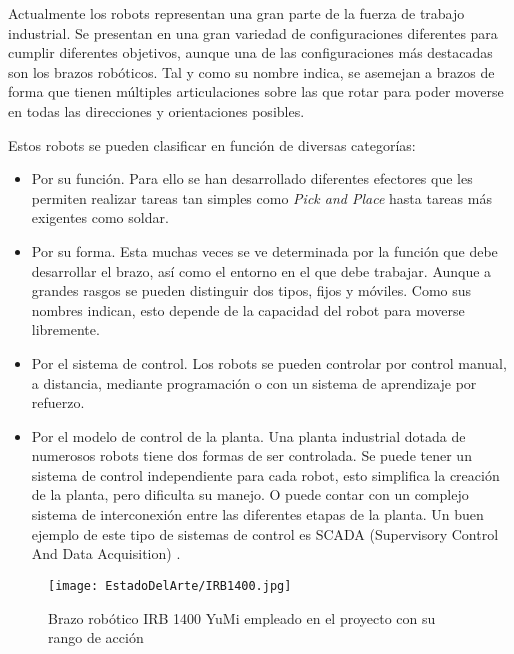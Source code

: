 Actualmente los robots representan una gran parte de la fuerza de trabajo industrial. Se presentan en una gran variedad de configuraciones diferentes para cumplir diferentes objetivos, aunque una de las configuraciones más destacadas son los brazos robóticos. Tal y como su nombre indica, se asemejan a brazos de forma que tienen múltiples articulaciones sobre las que rotar para poder moverse en todas las direcciones y orientaciones posibles. 

Estos robots se pueden clasificar en función de diversas categorías:
\begin{itemize}
\item Por su función. Para ello se han desarrollado diferentes efectores que les permiten realizar tareas tan simples como \textit{Pick and Place} hasta tareas más exigentes como soldar.
		
\item Por su forma. Esta muchas veces se ve determinada por la función que debe desarrollar el brazo, así como el entorno en el que debe trabajar. Aunque a grandes rasgos se pueden distinguir dos tipos, fijos y móviles. Como sus nombres indican, esto depende de la capacidad del robot para moverse libremente.
		
\item Por el sistema de control. Los robots se pueden controlar por control manual, a distancia, mediante programación o con un sistema de aprendizaje por refuerzo.
		
\item Por el modelo de control de la planta. Una planta industrial dotada de numerosos robots tiene dos formas de ser controlada. Se puede tener un sistema de control independiente para cada robot, esto simplifica la creación de la planta, pero dificulta su manejo. O puede contar con un complejo sistema de interconexión entre las diferentes etapas de la planta. Un buen ejemplo de este tipo de sistemas de control es SCADA (Supervisory Control And Data Acquisition) \cite{SCADA}.
\end{itemize}

\begin{figure}[h]
	\centering
	\texttt{[image: EstadoDelArte/IRB1400.jpg]}
	\caption[Brazo robótico IRB 1400 YuMi]{Brazo robótico IRB 1400 YuMi empleado en el proyecto con su rango de acción \cite{YuMi}}
	\label{chap:Estado de la cuestion fig:IRB1400}
	\vspace{-5pt}
\end{figure}

